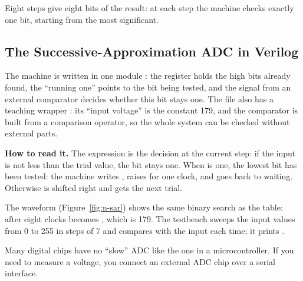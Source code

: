 Eight steps give eight bits of the result: at each step the machine checks
exactly one bit, starting from the most significant.

\subsection{The Successive-Approximation ADC in Verilog}

The machine is written in one module : the register 
holds the high bits already found, the ``running one''  points to the
bit being tested, and the signal  from an external comparator decides
whether this bit stays one. The file also has a teaching wrapper
: its ``input voltage'' is the constant 179, and the comparator
is built from a comparison operator, so the whole system can be checked without
external parts.


\textbf{How to read it.} The expression  is
the decision at the current step: if the input is not less than the trial value,
the bit stays one. When  is one, the lowest bit has been tested:
the machine writes , raises  for one clock, and goes back
to waiting. Otherwise  is shifted right and  gets the next
trial.


The waveform (Figure~\ref{fig:n-sar}) shows the same binary search as the
table: after eight clocks  becomes , which is 179. The
testbench  sweeps the input values from 0 to 255
in steps of 7 and compares  with the input each time; it prints
.

\begin{infobox}
Many digital chips have no ``slow'' ADC like the one in a microcontroller.
If you need to measure a voltage, you connect an external ADC chip over a
serial interface. 
\end{infobox}

